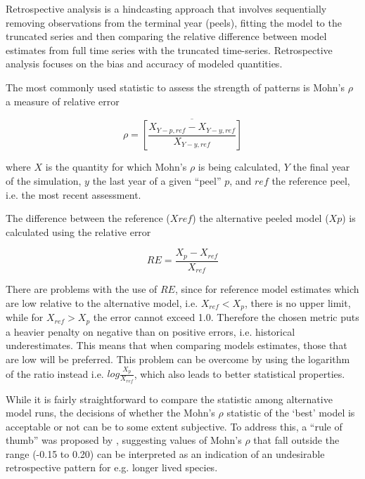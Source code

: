 Retrospective analysis is a hindcasting approach that involves sequentially removing observations from the terminal year (peels), fitting the model to the truncated series and then comparing the relative difference between model estimates from full time series with the truncated time-series. Retrospective analysis focuses on the bias and accuracy of modeled quantities. 

The most commonly used statistic to assess the strength of patterns is Mohn’s $\rho$ a measure of relative error

\begin{equation}\rho = \overline{ \left[ \frac{X_{Y-p,ref}-X_{Y-y,ref}}{X_{Y-y,ref}} \right]}\end{equation}

where $X$ is the quantity for which Mohn’s $\rho$ is being calculated, $Y$ the final year of the simulation, $y$ the last year of a given “peel” $p$, and $ref$ the reference peel, i.e. the most recent assessment.

The difference between the reference ($X{ref}$) the alternative peeled model ($X{p}$) is calculated using the relative error 

\begin{equation} RE=\frac{X_{p}-X_{ref}}{X_{ref}} \end{equation}
    
There are problems with the use of $RE$, since for reference model estimates which are low relative to the alternative model, i.e. $X_{ref} < X_{p}$, there is no upper limit, while for $X_{ref} > X_{p}$ the error cannot exceed 1.0. Therefore the chosen metric puts a heavier penalty on negative than on positive errors, i.e. historical underestimates. This means that when comparing models estimates, those that are low will be preferred. This problem can be overcome by using the logarithm of the ratio instead i.e. $log\frac{X_{p}}{X_{ref}}$, which also leads to better statistical properties.

While it is fairly straightforward to compare the  statistic among alternative model runs, the decisions of whether the Mohn’s $\rho$ statistic of the ‘best’ model is acceptable or not can be to some extent subjective. To address this, a “rule of thumb” was proposed by \cite{hurtado2014}, suggesting values of Mohn’s $\rho$ that fall outside the range (-0.15 to 0.20) can be interpreted as an indication of an undesirable retrospective pattern for e.g. longer lived species.




